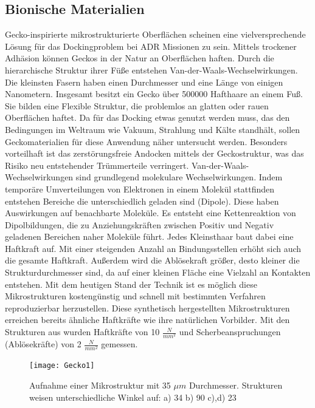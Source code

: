 		\subsection{Bionische Materialien}%
Gecko-inspirierte mikrostrukturierte Oberflächen scheinen eine vielversprechende Lösung für das Dockingproblem bei ADR Missionen zu sein. Mittels trockener Adhäsion können Geckos in der Natur an Oberflächen haften. Durch die hierarchische Struktur ihrer Füße entstehen Van-der-Waals-Wechselwirkungen. Die kleinsten Fasern haben einen Durchmesser und eine Länge von einigen Nanometern. Insgesamt besitzt ein Gecko über 500000 Hafthaare an einem Fuß. Sie bilden eine Flexible Struktur, die problemlos an glatten oder rauen Oberflächen haftet. Da für das Docking etwas genutzt werden muss, das den Bedingungen im Weltraum wie Vakuum, Strahlung und Kälte standhält, sollen Geckomaterialien für diese Anwendung näher untersucht werden. Besonders vorteilhaft ist das zerstörungsfreie Andocken mittels der Geckostruktur, was das Risiko neu entstehender Trümmerteile verringert.
Van-der-Waals-Wechselwirkungen sind grundlegend molekulare Wechselwirkungen. Indem temporäre Umverteilungen von Elektronen in einem Molekül stattfinden entstehen Bereiche die unterschiedlich geladen sind (Dipole). Diese haben Auswirkungen auf benachbarte Moleküle. Es entsteht eine Kettenreaktion von Dipolbildungen, die zu Anziehungskräften zwischen Positiv und Negativ geladenen Bereichen naher Moleküle führt. Jedes Kleinsthaar baut dabei eine Haftkraft auf. Mit einer steigenden Anzahl an Bindungsstellen erhöht sich auch die gesamte Haftkraft. Außerdem wird die Ablösekraft größer, desto kleiner die Strukturdurchmesser sind, da auf einer kleinen Fläche eine Vielzahl an Kontakten entstehen. \cite{Schwerter.}
Mit dem heutigen Stand der Technik ist es möglich diese Mikrostrukturen kostengünstig und schnell mit bestimmten Verfahren reproduzierbar herzustellen. Diese synthetisch hergestellten Mikrostrukturen erreichen bereits ähnliche Haftkräfte wie ihre natürlichen Vorbilder. Mit den Strukturen aus  wurden Haftkräfte von 10 $\frac{N}{mm^{2}}$ und Scherbeanspruchungen (Ablösekräfte)  von 2 $\frac{N}{mm^{2}}$ gemessen.
	\begin{figure}[h]
	\centering
		\texttt{[image: Gecko1]}
	\caption{Aufnahme einer Mikrostruktur mit 35 $\mu m$ Durchmesser. Strukturen weisen unterschiedliche Winkel auf: a) 	34\textdegree{}  b) 90\textdegree{}  c),d) 23\textdegree{} \cite{Schwerter.} \cite{Schwerter.}}
	\label{fig:Gecko1}
\end{figure}

